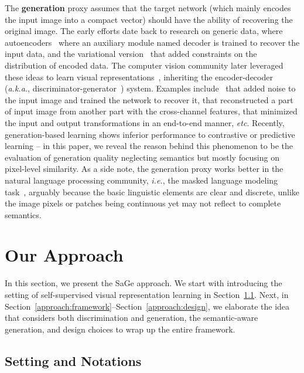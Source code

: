\documentclass[10pt,twocolumn,letterpaper]{article}
\begin{document}
The \textbf{generation} proxy assumes that the target network (which mainly encodes the input image into a compact vector) should have the ability of recovering the original image. The early efforts date back to research on generic data, where autoencoders~\cite{hinton2006reducing} where an auxiliary module named decoder is trained to recover the input data, and the variational version~\cite{kingma2013auto} that added constraints on the distribution of encoded data. The computer vision community later leveraged these ideas to learn visual representations~\cite{hinton2011transforming}, inheriting the encoder-decoder (\textit{a.k.a.}, discriminator-generator~\cite{donahue2016adversarial,dumoulin2016adversarially}) system. Examples include~\cite{vincent2008extracting,inpainting} that added noise to the input image and trained the network to recover it, \cite{zhang2017split} that reconstructed a part of input image from another part with the cross-channel features, \cite{aet} that minimized the input and output transformations in an end-to-end manner, \textit{etc}. Recently, generation-based learning shows inferior performance to contrastive or predictive learning -- in this paper, we reveal the reason behind this phenomenon to be the evaluation of generation quality neglecting semantics but mostly focusing on pixel-level similarity. As a side note, the generation proxy works better in the natural language processing community, \textit{i.e.}, the masked language modeling task~\cite{bert,lan2019albert,liu2019roberta}, arguably because the basic linguistic elements are clear and discrete, unlike the image pixels or patches being continuous yet may not reflect to complete semantics.

\section{Our Approach}
\label{sec:method}

In this section, we present the SaGe approach. We start with introducing the setting of self-supervised visual representation learning in Section~\ref{approach:setting}. Next, in Section~\ref{approach:framework}--Section~\ref{approach:design}, we elaborate the idea that considers both discrimination and generation, the semantic-aware generation, and design choices to wrap up the entire framework.

\subsection{Setting and Notations}
\label{approach:setting}
\end{document}
